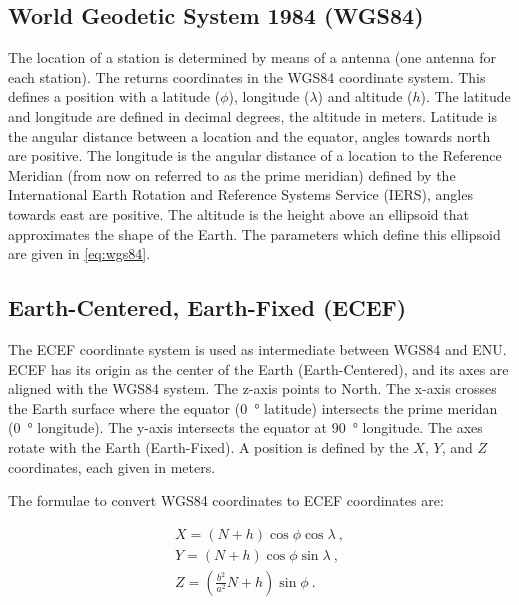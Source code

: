 \subsection{World Geodetic System 1984 (WGS84)}

The location of a \hisparc station is determined by means of a \gps
antenna (one antenna for each station). The \gps returns coordinates in
the WGS84 coordinate system. This defines a position with a latitude
($\phi$), longitude ($\lambda$) and altitude ($h$). The latitude and
longitude are defined in decimal degrees, the altitude in meters.
Latitude is the angular distance between a location and the equator,
angles towards north are positive. The longitude is the angular distance
of a location to the Reference Meridian (from now on referred to as the
prime meridian) defined by the International Earth Rotation and
Reference Systems Service (IERS), angles towards east are positive. The
altitude is the height above an ellipsoid that approximates the shape of
the Earth. The parameters which define this ellipsoid are given in
\eqref{eq:wgs84}.


\subsection{Earth-Centered, Earth-Fixed (ECEF)}

The ECEF coordinate system is used as intermediate between WGS84 and
ENU. ECEF has its origin as the center of the Earth (Earth-Centered),
and its axes are aligned with the WGS84 system. The z-axis points to
North. The x-axis crosses the Earth surface where the equator
(\SI{0}{\degree} latitude) intersects the prime meridan (\SI{0}{\degree}
longitude). The y-axis intersects the equator at \SI{90}{\degree}
longitude. The axes rotate with the Earth (Earth-Fixed). A position is
defined by the $X$, $Y$, and $Z$ coordinates, each given in meters.

The formulae to convert WGS84 coordinates to ECEF coordinates are:

\begin{equation}
    \begin{array}{l}
        X = \left(N + h\right) \cos{\phi} \cos{\lambda} \ , \\
        Y = \left(N + h\right) \cos{\phi} \sin{\lambda} \ , \\
        Z = \left(\frac{b^2}{a^2} N + h\right) \sin{\phi} \ .
    \end{array}
\end{equation}

